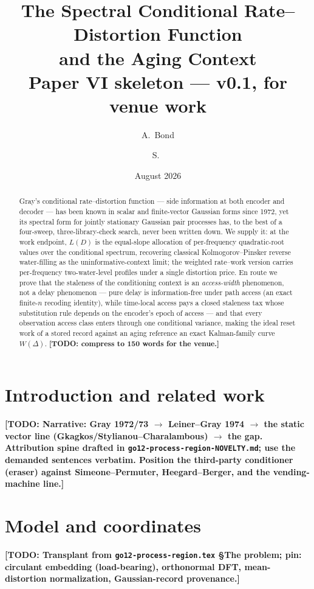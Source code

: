 \documentclass[11pt]{article}
\title{The Spectral Conditional Rate--Distortion Function\\and the
Aging Context\\[4pt]\large Paper VI skeleton --- v0.1, for venue work}
\author{A.~Bond \and S.~\todo{Syed's full name}}
\date{August 2026}
\theoremstyle{remark}
\newcommand{\todo}[1]{\textbf{[TODO: #1]}}
\begin{document}
\maketitle

\begin{abstract}
Gray's conditional rate--distortion function --- side information at
both encoder and decoder --- has been known in scalar and
finite-vector Gaussian forms since 1972, yet its spectral form for
jointly stationary Gaussian pair processes has, to the best of a
four-sweep, three-library-check search, never been written down. We
supply it: at the work endpoint, $L(D)$ is the equal-slope allocation
of per-frequency quadratic-root values over the conditional spectrum,
recovering classical Kolmogorov--Pinsker reverse water-filling as the
uninformative-context limit; the weighted rate--work version carries
per-frequency two-water-level profiles under a single distortion
price. En route we prove that the staleness of the conditioning
context is an \emph{access-width} phenomenon, not a delay phenomenon
--- pure delay is information-free under path access (an exact
finite-$n$ recoding identity), while time-local access pays a closed
staleness tax whose substitution rule depends on the encoder's epoch
of access --- and that every observation access class enters through
one conditional variance, making the ideal reset work of a stored
record against an aging reference an exact Kalman-family curve
$W(\Delta)$. \todo{compress to 150 words for the venue.}
\end{abstract}

\section{Introduction and related work}
\todo{Narrative: Gray 1972/73 $\to$ Leiner--Gray 1974 $\to$ the
static vector line (Gkagkos/Stylianou--Charalambous) $\to$ the gap.
Attribution spine drafted in
\texttt{go12-process-region-NOVELTY.md}; use the demanded sentences
verbatim. Position the third-party conditioner (eraser) against
Simeone--Permuter, Heegard--Berger, and the vending-machine line.}

\section{Model and coordinates}
\todo{Transplant from \texttt{go12-process-region.tex} \S The
problem; pin: circulant embedding (load-bearing), orthonormal DFT,
mean-distortion normalization, Gaussian-record provenance.}
\end{document}
